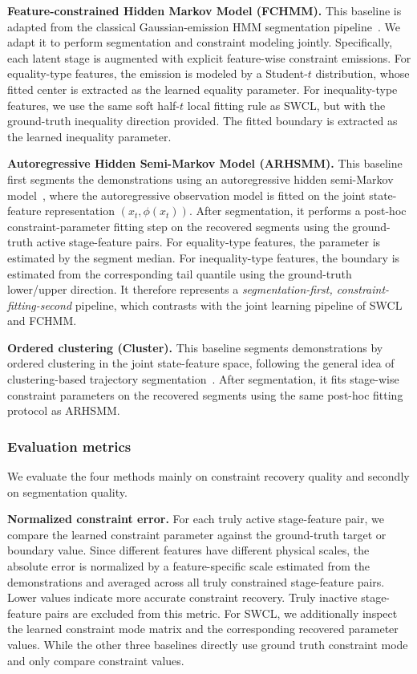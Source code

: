 \documentclass[lettersize,journal]{IEEEtran}
\begin{document}
\textbf{Feature-constrained Hidden Markov Model (FCHMM).}
This baseline is adapted from the classical Gaussian-emission HMM segmentation pipeline~\cite{rabiner1989hmm}. We adapt it to perform segmentation and constraint modeling jointly. Specifically, each latent stage is augmented with explicit feature-wise constraint emissions. For equality-type features, the emission is modeled by a Student-\(t\) distribution, whose fitted center is extracted as the learned equality parameter. For inequality-type features, we use the same soft half-\(t\) local fitting rule as SWCL, but with the ground-truth inequality direction provided. The fitted boundary is extracted as the learned inequality parameter.

\textbf{Autoregressive Hidden Semi-Markov Model (ARHSMM).}
This baseline first segments the demonstrations using an autoregressive hidden semi-Markov model~\cite{johnson2013hsmm}, where the autoregressive observation model is fitted on the joint state-feature representation $(x_t,\phi(x_t))$. After segmentation, it performs a post-hoc constraint-parameter fitting step on the recovered segments using the ground-truth active stage-feature pairs. For equality-type features, the parameter is estimated by the segment median. For inequality-type features, the boundary is estimated from the corresponding tail quantile using the ground-truth lower/upper direction. It therefore represents a \emph{segmentation-first, constraint-fitting-second} pipeline, which contrasts with the joint learning pipeline of SWCL and FCHMM.

\textbf{Ordered clustering (Cluster).}
This baseline segments demonstrations by ordered clustering in the joint state-feature space, following the general idea of clustering-based trajectory segmentation~\cite{keogh2004segmenting}. After segmentation, it fits stage-wise constraint parameters on the recovered segments using the same post-hoc fitting protocol as ARHSMM. 

\subsubsection{Evaluation metrics}
We evaluate the four methods mainly on constraint recovery quality and secondly on segmentation quality.

\textbf{Normalized constraint error.}
For each truly active stage-feature pair, we compare the learned constraint parameter against the ground-truth target or boundary value. Since different features have different physical scales, the absolute error is normalized by a feature-specific scale estimated from the demonstrations and averaged across all truly constrained stage-feature pairs. Lower values indicate more accurate constraint recovery. Truly inactive stage-feature pairs are excluded from this metric. For SWCL, we additionally inspect the learned constraint mode matrix and the corresponding recovered parameter values. While the other three baselines directly use ground truth constraint mode and only compare constraint values. 
\end{document}
